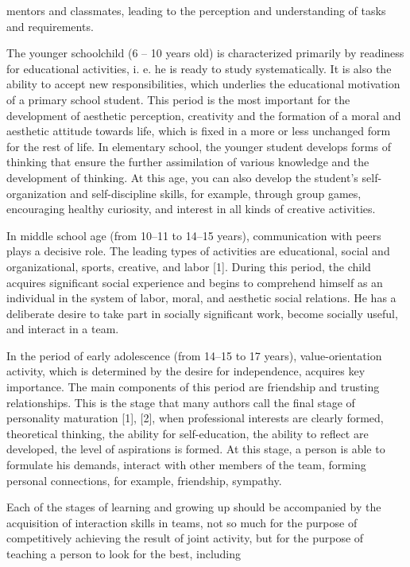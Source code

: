 \documentclass{article}
\begin{document}
\begin{multicols}{2}
mentors and classmates, leading to the perception and
understanding of tasks and requirements.
\par The younger schoolchild (6 – 10 years old) is characterized primarily by readiness for educational activities,
i. e. he is ready to study systematically. It is also the
ability to accept new responsibilities, which underlies
the educational motivation of a primary school student.
This period is the most important for the development
of aesthetic perception, creativity and the formation of a
moral and aesthetic attitude towards life, which is fixed
in a more or less unchanged form for the rest of life. In
elementary school, the younger student develops forms
of thinking that ensure the further assimilation of various
knowledge and the development of thinking. At this age,
you can also develop the student’s self-organization and
self-discipline skills, for example, through group games,
encouraging healthy curiosity, and interest in all kinds of
creative activities.
\par In middle school age (from 10–11 to 14–15 years),
communication with peers plays a decisive role. The
leading types of activities are educational, social and
organizational, sports, creative, and labor [1]. During this
period, the child acquires significant social experience
and begins to comprehend himself as an individual in the
system of labor, moral, and aesthetic social relations. He
has a deliberate desire to take part in socially significant
work, become socially useful, and interact in a team.
\par In the period of early adolescence (from 14–15 to
17 years), value-orientation activity, which is determined
by the desire for independence, acquires key importance.
The main components of this period are friendship and
trusting relationships. This is the stage that many authors
call the final stage of personality maturation [1], [2],
when professional interests are clearly formed, theoretical
thinking, the ability for self-education, the ability to
reflect are developed, the level of aspirations is formed.
At this stage, a person is able to formulate his demands,
interact with other members of the team, forming personal connections, for example, friendship, sympathy.
\par Each of the stages of learning and growing up should
be accompanied by the acquisition of interaction skills
in teams, not so much for the purpose of competitively
achieving the result of joint activity, but for the purpose
of teaching a person to look for the best, including

\end{multicols}
\end{document}
